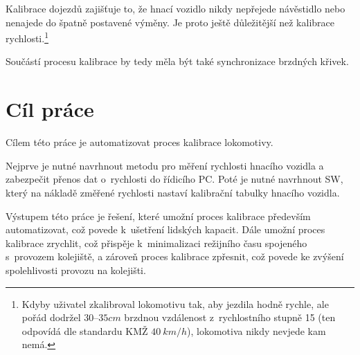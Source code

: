 Kalibrace dojezdů zajišťuje to, že hnací vozidlo nikdy nepřejede návěstidlo nebo
nenajede do špatně postavené výměny. Je proto ještě důležitější než kalibrace
rychlosti.\footnote{Kdyby uživatel zkalibroval lokomotivu tak, aby jezdila
hodně rychle, ale pořád dodržel $30$--$35cm$ brzdnou vzdálenost z~rychlostního
stupně 15 (ten odpovídá dle standardu KMŽ $40\ km/h$), lokomotiva nikdy nevjede
kam nemá.}

Součástí procesu kalibrace by tedy měla být také synchronizace brzdných křivek.

\section{Cíl práce}
\label{sec:cil}

Cílem této práce je automatizovat proces kalibrace lokomotivy.

Nejprve je nutné navrhnout metodu pro měření rychlosti hnacího vozidla a
zabezpečit přenos dat o~rychlosti do řídicího PC. Poté je nutné navrhnout SW,
který na nákladě změřené rychlosti nastaví kalibrační tabulky hnacího vozidla.

Výstupem této práce je řešení, které umožní proces kalibrace především
automatizovat, což povede k~ušetření lidských kapacit. Dále umožní proces
kalibrace zrychlit, což přispěje k~minimalizaci režijního času spojeného
s~provozem kolejiště, a zároveň proces kalibrace zpřesnit, což povede ke
zvýšení spolehlivosti provozu na kolejišti.
